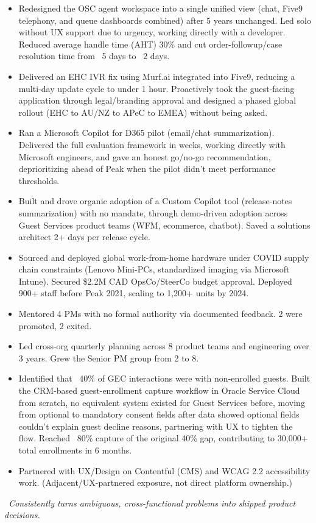 \documentclass[11pt,a4paper,sans]{moderncv}
\newcommand{\insight}[1]{\vspace{2pt}\par{\small\itshape\color{lightbulbyellow}\faIcon{lightbulb}\color{color1}\ #1}}
\begin{document}
{\begin{itemize}
    \item Redesigned the OSC agent workspace into a single unified view (chat, Five9 telephony, and queue dashboards combined) after 5 years unchanged. Led solo without UX support due to urgency, working directly with a developer. Reduced average handle time (AHT) 30\% and cut order-followup/case resolution time from ~5 days to ~2 days.
    \item Delivered an EHC IVR fix using Murf.ai integrated into Five9, reducing a multi-day update cycle to under 1 hour. Proactively took the guest-facing application through legal/branding approval and designed a phased global rollout (EHC to AU/NZ to APeC to EMEA) without being asked.
    \item Ran a Microsoft Copilot for D365 pilot (email/chat summarization). Delivered the full evaluation framework in weeks, working directly with Microsoft engineers, and gave an honest go/no-go recommendation, deprioritizing ahead of Peak when the pilot didn't meet performance thresholds.
    \item Built and drove organic adoption of a Custom Copilot tool (release-notes summarization) with no mandate, through demo-driven adoption across Guest Services product teams (WFM, ecommerce, chatbot). Saved a solutions architect 2+ days per release cycle.
    \item Sourced and deployed global work-from-home hardware under COVID supply chain constraints (Lenovo Mini-PCs, standardized imaging via Microsoft Intune). Secured \$2.2M CAD OpsCo/SteerCo budget approval. Deployed 900+ staff before Peak 2021, scaling to 1,200+ units by 2024.
    \item Mentored 4 PMs with no formal authority via documented feedback. 2 were promoted, 2 exited.
    \item Led cross-org quarterly planning across 8 product teams and engineering over 3 years. Grew the Senior PM group from 2 to 8.
    \item Identified that ~40\% of GEC interactions were with non-enrolled guests. Built the CRM-based guest-enrollment capture workflow in Oracle Service Cloud from scratch, no equivalent system existed for Guest Services before, moving from optional to mandatory consent fields after data showed optional fields couldn't explain guest decline reasons, partnering with UX to tighten the flow. Reached ~80\% capture of the original 40\% gap, contributing to 30,000+ total enrollments in 6 months.
    \item Partnered with UX/Design on Contentful (CMS) and WCAG 2.2 accessibility work. (Adjacent/UX-partnered exposure, not direct platform ownership.)
\end{itemize}}
\insight{Consistently turns ambiguous, cross-functional problems into shipped product decisions.}
\end{document}
